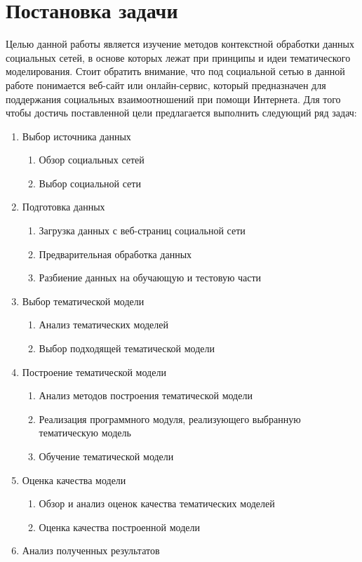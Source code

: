 \documentclass[a4paper]{report}
\begin{document}
	\section{Постановка задачи}
	Целью данной работы является изучение методов контекстной обработки данных социальных сетей, в основе которых лежат при принципы и идеи тематического моделирования. Стоит обратить внимание, что под социальной сетью в данной работе понимается веб-сайт или онлайн-сервис, который предназначен для поддержания социальных взаимоотношений при помощи Интернета. 
	 Для того чтобы достичь поставленной цели предлагается выполнить следующий ряд задач:
	
	
	\renewcommand{\labelenumi}{\arabic{enumi}.}
	\renewcommand{\labelenumii}{\arabic{enumi}.\arabic{enumii}}

	\begin{enumerate}
	\item{Выбор источника данных}
		\begin{enumerate}
		\item{Обзор социальных сетей}
		\item{Выбор социальной сети}
		\end{enumerate}
	\item{Подготовка данных}
		\begin{enumerate}
		\item{Загрузка данных с веб-страниц социальной сети}
		\item{Предварительная обработка данных}
		\item{Разбиение данных на обучающую и тестовую части}
		\end{enumerate}
	\item{Выбор тематической модели}
		\begin{enumerate}
		\item{Анализ тематических моделей}
		\item{Выбор подходящей тематической модели}
		\end{enumerate}
	\item{Построение тематической модели}
		\begin{enumerate}
		\item{Анализ методов построения тематической модели}
		\item{Реализация программного модуля, реализующего выбранную тематическую модель}
		\item{Обучение тематической модели}
		\end{enumerate}
	\item{Оценка качества модели}
		\begin{enumerate}
		\item{Обзор и анализ оценок качества тематических моделей}
		\item{Оценка качества построенной модели}
		\end{enumerate}
	\item{Анализ полученных результатов}
	\end{enumerate}
\end{document}
